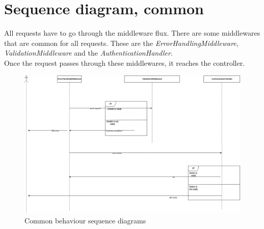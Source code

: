     \section{Sequence diagram, common}
    All requests have to go through the middleware flux. There are some middlewares that are common for all requests. These are the \textit{ErrorHandlingMiddleware}, \textit{ValidationMiddleware} and the \textit{AuthenticationHandler}. \\
    Once the request passes through these middlewares, it reaches the controller.
        \begin{figure}[H]
            \centering
                \includegraphics[width=\textwidth]{assets/diagrams/sequence_common.png}
            \caption{Common behaviour sequence diagrams}
            \label{fig:implementation_common}
        \end{figure}


